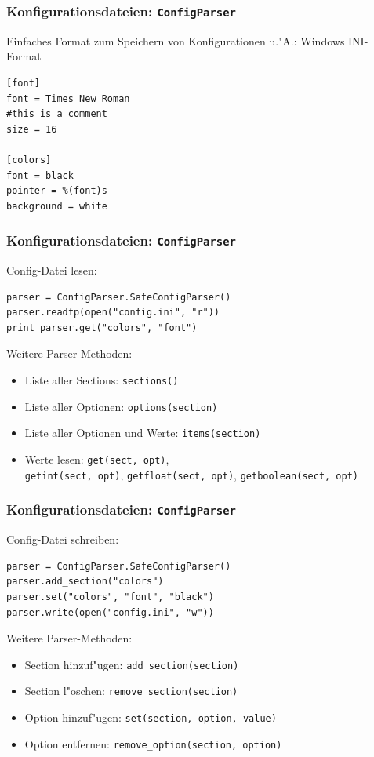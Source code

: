 \begin{frame}[fragile]
\frametitle{Konfigurationsdateien: \texttt{ConfigParser}}
Einfaches Format zum Speichern von Konfigurationen u."A.: Windows INI-Format
\begin{lstlisting}[style=Python]
[font]
font = Times New Roman
#this is a comment
size = 16

[colors]
font = black
pointer = %(font)s
background = white
\end{lstlisting}
\end{frame}

\begin{frame}[fragile]
\frametitle{Konfigurationsdateien: \texttt{ConfigParser}}
Config-Datei lesen:
\begin{lstlisting}[style=Python]
parser = ConfigParser.SafeConfigParser()
parser.readfp(open("config.ini", "r"))
print parser.get("colors", "font")
\end{lstlisting}
Weitere Parser-Methoden:
\begin{itemize}
\item Liste aller Sections: \texttt{sections()}
\item Liste aller Optionen: \texttt{options(section)}
\item Liste aller Optionen und Werte: \texttt{items(section)}
\item Werte lesen: \texttt{get(sect, opt)}, \\
\texttt{getint(sect, opt)}, \texttt{getfloat(sect, opt)}, \texttt{getboolean(sect, opt)}
\end{itemize}
\end{frame}

\begin{frame}[fragile]
\frametitle{Konfigurationsdateien: \texttt{ConfigParser}}
Config-Datei schreiben:
\begin{lstlisting}[style=Python]
parser = ConfigParser.SafeConfigParser()
parser.add_section("colors")
parser.set("colors", "font", "black")
parser.write(open("config.ini", "w"))
\end{lstlisting}
Weitere Parser-Methoden:
\begin{itemize}
\item Section hinzuf"ugen: \texttt{add\_section(section)}
\item Section l"oschen: \texttt{remove\_section(section)}
\item Option hinzuf"ugen: \texttt{set(section, option, value)}
\item Option entfernen: \texttt{remove\_option(section, option)}
\end{itemize}
\end{frame}


